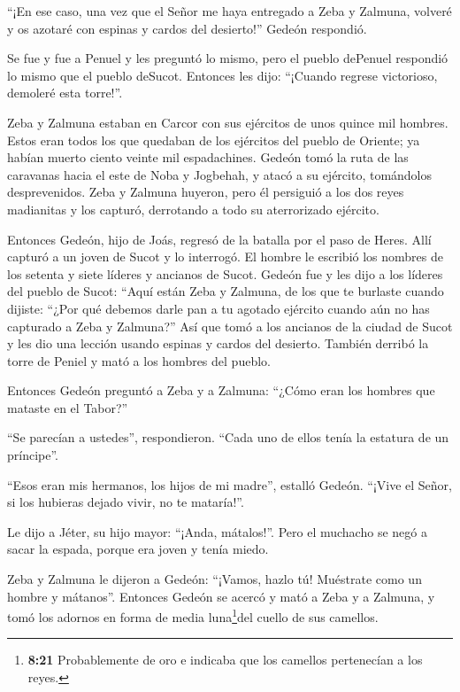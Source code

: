  ``¡En ese caso, una vez que el Señor me haya entregado a
Zeba y Zalmuna, volveré y os azotaré con espinas y cardos del
desierto!'' Gedeón respondió.

 Se fue y fue a Penuel y les preguntó lo mismo, pero el
pueblo dePenuel respondió lo mismo que el pueblo deSucot. 
Entonces les dijo: ``¡Cuando regrese victorioso, demoleré esta torre!''.

 Zeba y Zalmuna estaban en Carcor con sus ejércitos de unos
quince mil hombres. Estos eran todos los que quedaban de los ejércitos
del pueblo de Oriente; ya habían muerto ciento veinte mil espadachines.
 Gedeón tomó la ruta de las caravanas hacia el este de Noba
y Jogbehah, y atacó a su ejército, tomándolos desprevenidos.
 Zeba y Zalmuna huyeron, pero él persiguió a los dos reyes
madianitas y los capturó, derrotando a todo su aterrorizado ejército.

 Entonces Gedeón, hijo de Joás, regresó de la batalla por
el paso de Heres.  Allí capturó a un joven de Sucot y lo
interrogó. El hombre le escribió los nombres de los setenta y siete
líderes y ancianos de Sucot.  Gedeón fue y les dijo a los
líderes del pueblo de Sucot: ``Aquí están Zeba y Zalmuna, de los que te
burlaste cuando dijiste: ``¿Por qué debemos darle pan a tu agotado
ejército cuando aún no has capturado a Zeba y Zalmuna?'' 
Así que tomó a los ancianos de la ciudad de Sucot y les dio una lección
usando espinas y cardos del desierto.  También derribó la
torre de Peniel y mató a los hombres del pueblo.

 Entonces Gedeón preguntó a Zeba y a Zalmuna: ``¿Cómo eran
los hombres que mataste en el Tabor?''

``Se parecían a ustedes'', respondieron. ``Cada uno de ellos tenía la
estatura de un príncipe''.

 ``Esos eran mis hermanos, los hijos de mi madre'', estalló
Gedeón. ``¡Vive el Señor, si los hubieras dejado vivir, no te
mataría!''.

 Le dijo a Jéter, su hijo mayor: ``¡Anda, mátalos!''. Pero
el muchacho se negó a sacar la espada, porque era joven y tenía miedo.

 Zeba y Zalmuna le dijeron a Gedeón: ``¡Vamos, hazlo tú!
Muéstrate como un hombre y mátanos''. Entonces Gedeón se acercó y mató a
Zeba y a Zalmuna, y tomó los adornos en forma de media
luna\footnote{\textbf{8:21} Probablemente de oro e indicaba que los
  camellos pertenecían a los reyes.}del cuello de sus camellos.

